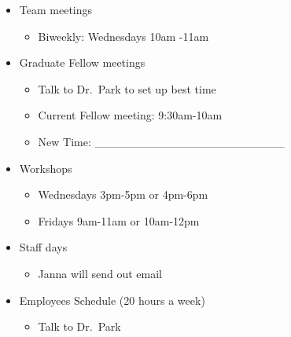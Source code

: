 \documentclass[
]{book}
\providecommand{\tightlist}{%
  \setlength{\itemsep}{0pt}\setlength{\parskip}{0pt}}
\begin{document}
\begin{itemize}
\tightlist
\item
  Team meetings

  \begin{itemize}
  \tightlist
  \item
    Biweekly: Wednesdays 10am -11am\\
  \end{itemize}
\item
  Graduate Fellow meetings

  \begin{itemize}
  \tightlist
  \item
    Talk to Dr.~Park to set up best time\\
  \item
    Current Fellow meeting: 9:30am-10am\\
  \item
    New Time: \_\_\_\_\_\_\_\_\_\_\_\_\_\_\_\_\_\_\_\_\_\_\_\\
  \end{itemize}
\item
  Workshops

  \begin{itemize}
  \tightlist
  \item
    Wednesdays 3pm-5pm or 4pm-6pm\\
  \item
    Fridays 9am-11am or 10am-12pm\\
  \end{itemize}
\item
  Staff days

  \begin{itemize}
  \tightlist
  \item
    Janna will send out email\\
  \end{itemize}
\item
  Employees Schedule (20 hours a week)

  \begin{itemize}
  \tightlist
  \item
    Talk to Dr.~Park
  \end{itemize}
\end{itemize}
\end{document}
